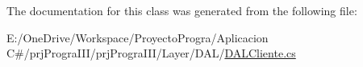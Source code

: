The documentation for this class was generated from the following file\+:\begin{DoxyCompactItemize}
\item 
E\+:/\+One\+Drive/\+Workspace/\+Proyecto\+Progra/\+Aplicacion C\#/prj\+Progra\+I\+I\+I/prj\+Progra\+I\+I\+I/\+Layer/\+D\+A\+L/\hyperlink{_d_a_l_cliente_8cs}{D\+A\+L\+Cliente.\+cs}\end{DoxyCompactItemize}

